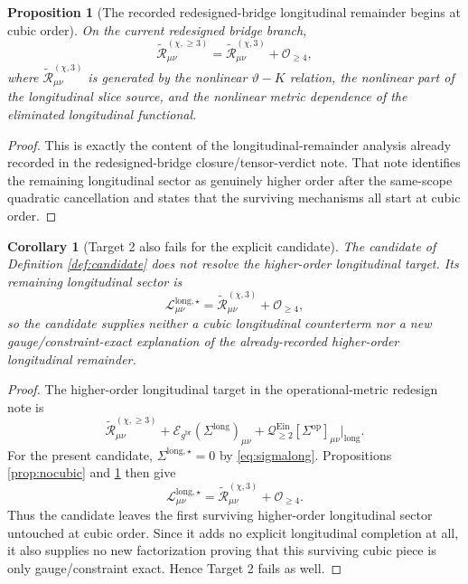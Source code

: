 \documentclass[11pt]{article}
\newcommand{\ReBridge}{g^{\mathrm{br}}}
\newcommand{\SigmaOp}{\Sigma^{\mathrm{op}}}
\newcommand{\ReLong}{\widetilde{\mathcal R}_{\mu\nu}^{(\chi,\ge 3)}}
\newcommand{\ReLongThree}{\widetilde{\mathcal R}_{\mu\nu}^{(\chi,3)}}
\newcommand{\EinLin}{\mathcal E_{\ReBridge}}
\newcommand{\EinQuad}{\mathcal Q_{\ge 2}^{\mathrm{Ein}}}
\newtheorem{proposition}{Proposition}
\newtheorem{corollary}{Corollary}
\begin{document}
\begin{proposition}[The recorded redesigned-bridge longitudinal remainder begins at cubic order]
\label{prop:cubic}
On the current redesigned bridge branch,
\begin{equation}
\ReLong
=
\ReLongThree+\mathcal O_{\ge 4},
\label{eq:cubic}
\end{equation}
where \(\ReLongThree\) is generated by the nonlinear \(\vartheta-K\) relation, the nonlinear part of the longitudinal slice source, and the nonlinear metric dependence of the eliminated longitudinal functional.
\end{proposition}

\begin{proof}
This is exactly the content of the longitudinal-remainder analysis already recorded in the redesigned-bridge closure/tensor-verdict note. That note identifies the remaining longitudinal sector as genuinely higher order after the same-scope quadratic cancellation and states that the surviving mechanisms all start at cubic order.
\end{proof}

\begin{corollary}[Target 2 also fails for the explicit candidate]
\label{cor:target2}
The candidate of Definition \ref{def:candidate} does \emph{not} resolve the higher-order longitudinal target. Its remaining longitudinal sector is
\begin{equation}
\mathcal L_{\mu\nu}^{\mathrm{long},\star}
=
\ReLongThree
+\mathcal O_{\ge 4},
\label{eq:longstar}
\end{equation}
so the candidate supplies neither a cubic longitudinal counterterm nor a new gauge/constraint-exact explanation of the already-recorded higher-order longitudinal remainder.
\end{corollary}

\begin{proof}
The higher-order longitudinal target in the operational-metric redesign note is
\[
\ReLong
+\EinLin(\Sigma^{\mathrm{long}})_{\mu\nu}
+\EinQuad[\SigmaOp]_{\mu\nu}\Big|_{\mathrm{long}}.
\]
For the present candidate, \(\Sigma^{\mathrm{long},\star}=0\) by \eqref{eq:sigmalong}. Propositions \ref{prop:nocubic} and \ref{prop:cubic} then give
\[
\mathcal L_{\mu\nu}^{\mathrm{long},\star}
=
\ReLongThree+\mathcal O_{\ge 4}.
\]
Thus the candidate leaves the first surviving higher-order longitudinal sector untouched at cubic order. Since it adds no explicit longitudinal completion at all, it also supplies no new factorization proving that this surviving cubic piece is only gauge/constraint exact. Hence Target 2 fails as well.
\end{proof}
\end{document}
